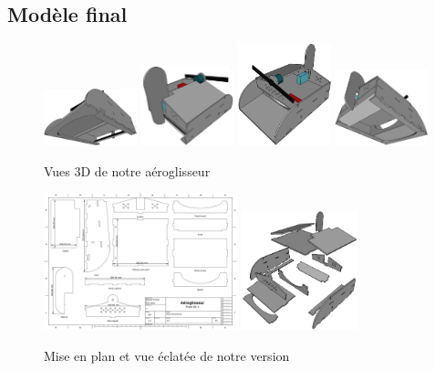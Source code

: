 \documentclass[a4paper,12pt]{book}
\begin{document}
			\subsection{Modèle final}
			\begin{figure}[h]
					\includegraphics[width=0.24\textwidth]{../Illus/vuedessous}
					\includegraphics[width=0.24\textwidth]{../Illus/vuedessusa}
					\includegraphics[width=0.24\textwidth]{../Illus/vuedessus}
					\includegraphics[width=0.24\textwidth]{../Illus/vuedessousa}
					\caption{Vues 3D de notre aéroglisseur}
					\label{vues}
				\end{figure}
				\begin{figure}
					\begin{center}
						 \includegraphics[width=0.5\textwidth]{../Illus/MiseEnPlanModif}
						 \includegraphics[width=0.3\textwidth]{../Illus/eclate}
					\end{center}
					\caption{Mise en plan et vue éclatée de notre version}
					\label{MEP}
				\end{figure}
\end{document}
